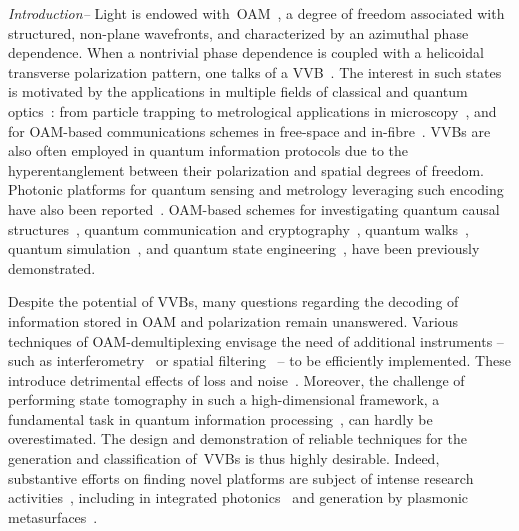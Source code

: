 \documentclass[
	aps, prl, superscriptaddress, twocolumn,
	10pt
	floatfix, 
    nofootinbib,
	tightenlines
]{revtex4-1}
\begin{document}
\textit{Introduction--} Light is endowed with~\ac{OAM}~\cite{allen_0AM_1992,padgett2004light}, a degree of freedom associated with structured, non-plane wavefronts, and characterized by an azimuthal phase dependence. 
When a nontrivial phase dependence is coupled with a helicoidal transverse polarization pattern, one talks of a \ac{VVB}~\cite{erhard2018twisted, Miles}.
The interest in such states is motivated by the applications in multiple fields of classical and quantum optics~\cite{Marrucci2011Rev, Cozzolino_rev}: from particle trapping to metrological applications in microscopy~\cite{Cardano2015Rev, roadMap}, and for OAM-based communications schemes in free-space and in-fibre~\cite{Willner:15,cozzolino2019air}.
\acp{VVB} are also often employed in quantum information protocols due to the hyperentanglement between their polarization and spatial degrees of freedom. Photonic platforms for quantum sensing and metrology leveraging such encoding have also been reported~\cite{fickler2012quantum,dambrosio_gear2013}. OAM-based schemes for investigating quantum causal structures~\cite{Goswami2018}, quantum communication and cryptography~\cite{vallone_qkd_2014,Wang2015,Mirhosseini_2015,Malik2016,Sit17,Cozzolino2019_fiber}, quantum walks~\cite{zhang-oam-qw-2010,goyal2013implementing,cardano2015quantum}, quantum simulation~\cite{cardano2016statistical,cardano_zak_2017}, and quantum state engineering~\cite{Innocenti2017,giordani_2018}, have been previously demonstrated. 

Despite the potential of \acp{VVB}, many questions regarding the decoding of information stored in OAM and polarization remain unanswered. Various techniques of OAM-demultiplexing envisage the need of additional instruments -- such as interferometry~\cite{Leach2002_oamSorter,Slussarenko2010_oamSorter,Bauer2014} or spatial filtering~\cite{Berkhout2010_oamSorter,bolduc2013holo,Mehul2014_oamSorter} -- to be efficiently implemented.
These introduce detrimental effects of loss and noise~\cite{Qassim2014}. Moreover, the challenge of performing state tomography in such a high-dimensional framework, a fundamental task in quantum information processing~\cite{Paris2004, Banaszek_2013}, can hardly be overestimated. The design and demonstration of reliable techniques for the generation and classification of~\acp{VVB} is thus highly desirable. Indeed, substantive efforts on finding novel platforms are subject of intense research activities~\cite{Liu:17,Ndagano:18, Cardano2015Rev,roadMap},
including in integrated photonics~\cite{ oamchip,cai2012integrated,chiptofiber} and generation by plasmonic metasurfaces~\cite{karimi2014,yue2016}.
\end{document}

